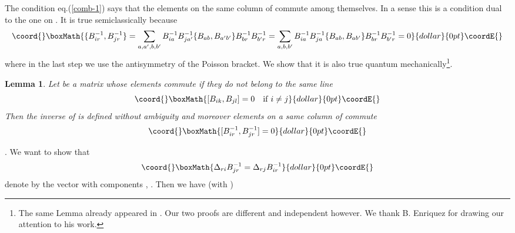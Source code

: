 \documentclass[a4paper,11pt]{article}
\newtheorem{lemma}{Lemma}
\def\proof{\noindent  {\underline {Proof}}. }
\begin{document}
The condition eq.(\ref{comb-1}) says that the elements on the same column of 
\coordHE{}  commute among
themselves. In a sense this is a condition dual to the one on \coordHE{}. It is true 
semiclassically because
$$\coord{}\boxMath{
\{ B^{-1}_{ir}, B^{-1}_{jr} \} = \sum_{a,a',b,b'} B^{-1}_{ia} B^{-1}_{ja'}
\{ B_{ab}, B_{a'b'} \} B^{-1}_{br} B^{-1}_{b'r} =
\sum_{a,b,b'} B^{-1}_{ia} B^{-1}_{ja}
\{ B_{ab}, B_{ab'} \} B^{-1}_{br} B^{-1}_{b'r}=0
}{dollar}{0pt}\coordE{}$$
where in the last step we use the antisymmetry of the Poisson bracket.
We show that it is also true quantum mechanically\footnote{The same Lemma already appeared in  \cite{ER01}. Our two proofs are different and independent however.   We thank B. Enriquez for drawing our attention to his work.}.
\begin{lemma}
Let \coordHE{} be a matrix whose elements commute if they do not belong 
to the same line
$$\coord{}\boxMath{
\relax [ B_{ik} , B_{jl} ] = 0 \quad {\rm if } \; i \neq j
}{dollar}{0pt}\coordE{}$$
Then the inverse \coordHE{} of \coordHE{} is defined without ambiguity and
moreover elements on a same column of \coordHE{} commute
$$\coord{}\boxMath{
\relax  [ B^{-1}_{ir} , B^{-1}_{jr} ] = 0 
}{dollar}{0pt}\coordE{}$$
\end{lemma}
\proof
We want to show that
$$\coord{}\boxMath{
\Delta_{ri}B^{-1}_{jr} = \Delta_{rj}B^{-1}_{ir}
}{dollar}{0pt}\coordE{}$$
denote by \coordHE{} the vector with components \coordHE{}, \coordHE{}. Then
we have (with \coordHE{})
\end{document}
